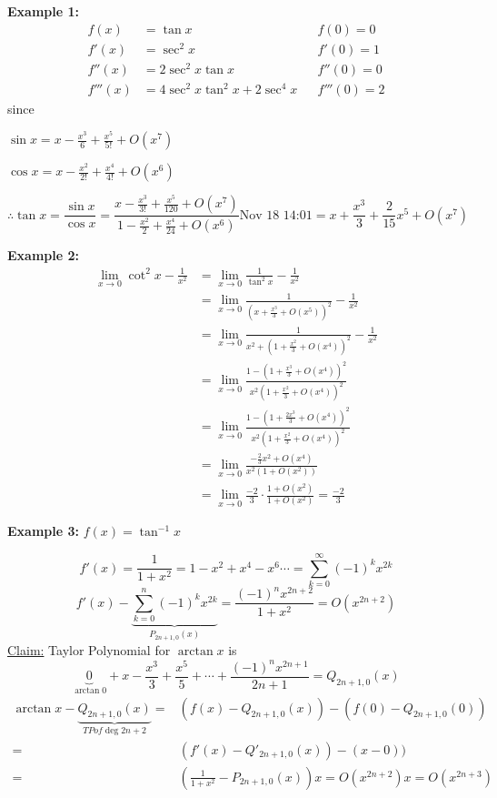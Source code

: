 \documentclass[12pt]{article}
\theoremstyle{plain}
\newcommand{\dlim}{\displaystyle\lim\limits}
\begin{document}
	{\color{Brown} 
	\textbf{Example 1: }
	\begin{align*}
		f(x) &= \tan x & &f(0)=0\\
		f'(x) &= \sec^2x & &f'(0)=1 \\
		f''(x) &= 2\sec^2 x\tan x & &  f''(0)=0\\
		f'''(x) &= 4\sec^2 x \tan ^2 x+ 2\sec^4 x & & f'''(0)= 2
	\end{align*}
	since 
	\begin{description}
		\item $\sin x = x -\frac{x^3}6+\frac{x^5}{5!}+O(x^7)$
		\item $\cos x = x -\frac{x^2}{2!}+\frac{x^4}{4!}+O(x^6)$
	\end{description}

	\[
		\therefore \tan x = \frac{\sin x}{\cos x} = 
			\frac{x-\frac{x^3}{3!}+\frac{x^5}{120}+O(x^7)}
			{1-\frac{x^2}2+\frac{x^4}{24}+O(x^6)}
			\text{Nov 18 14:01}
			=x+\frac{x^3}3+\frac2{15}x^5+O(x^7)
	\]


	\textbf{Example 2: }
	\begin{align*}
		\dlim_{x\to 0}\cot^2x-\frac1{x^2}
		&=\dlim_{x\to 0}\frac1{\tan^2x}-\frac1{x^2}\\
		&=\dlim_{x\to 0}\frac1{(x+\frac{x^3}3+O(x^5))^2}-\frac1{x^2}\\
		&=\dlim_{x\to 0}\frac1{x^2+(1+\frac{x^2}3+O(x^4))^2}-\frac1{x^2}\\
		&=\dlim_{x\to 0}\frac{1-(1+\frac{x^3}3+O(x^4))^2}
		{x^2(1+\frac{x^2}3+O(x^4))^2}\\
		&=\dlim_{x\to 0}\frac{1-(1+\frac{2x^3}3+O(x^4))^2}
		{x^2(1+\frac{x^2}3+O(x^4))^2}\\
		&=\dlim_{x\to 0}\frac{-\frac23x^2+O(x^4)}{x^2(1+O(x^2))}\\
		&=\dlim_{x\to 0}\frac{-2}3\cdot  \frac{1+O(x^2)}{1+O(x^2)}=\frac{-2}3
	\end{align*}


	\textbf{Example 3:}
	$f(x) = \tan^{-1}x$

	\[
		f'(x) = \frac1{1+x^2} =1 -x^2+x^4-x^6\cdots
		=\sum_{k=0}^{\infty}(-1)^kx^{2k}
	\]
	\[
		f'(x) - \underbrace{\sum_{k=0}^n (-1)^k x^{2k}}_{P_{2n+1,0}(x)} 
		= \frac{(-1)^nx^{2n+2}}{1+x^2}=O(x^{2n+2})
	\]
	\underline{Claim:} Taylor Polynomial for $\arctan x$ is 
	\[
	\underbrace{0}_{\arctan 0} + x - \frac{x^3}3+\frac{x^5}5+\cdots+
	\frac{(-1)^nx^{2n+1}}{2n+1}=Q_{2n+1,0}(x) 
	\]
	\begin{align*}
		\arctan x - \underbrace{Q_{2n+1,0}(x)}_{TP of \deg 2n+2}
		=& (f(x) - Q_{2n+1,0}(x))-(f(0)-Q_{2n+1,0}(0))\\
		=& (f'(x) - Q'_{2n+1,0}(x))-(x-0))\\
		=& (\frac1{1+x^2}-P_{2n+1,0}(x))x
		=O(x^{2n+2})x = O(x^{2n+3})
	\end{align*}

}
\end{document}

